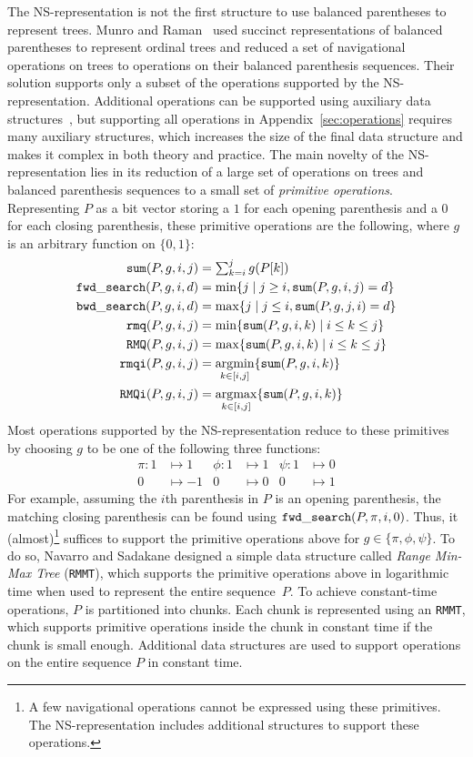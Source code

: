 The NS-representa\-tion is not the first structure to use balanced
parentheses to represent trees.  Munro and Raman~\cite{mr1997} used
succinct representations of balanced parentheses to represent ordinal trees
and reduced a set of navigational operations on trees to operations on their
balanced parenthesis sequences.  Their solution supports only a subset of the
operations supported by the NS-representation.  Additional operations
can be supported using auxiliary data structures~\cite{ly2008}, but
supporting all operations in Appendix~\ref{sec:operations} requires many
auxiliary structures, which increases the size of the final data structure
and makes it complex in both theory and practice.  The main novelty of
the NS-representation lies in its reduction of a large set of
operations on trees and balanced parenthesis sequences to a small set
of \emph{primitive operations}.  Representing $P$ as a bit vector
storing a $1$ for each opening parenthesis and a $0$ for each closing
parenthesis, these primitive operations are the following, where $g$ is an
arbitrary function on $\{0,1\}$:
\begin{align*}
  \mathtt{sum}(P,g,i,j) &= \textstyle\sum_{k=i}^jg(P[k])\\
  \mathtt{fwd\_search}(P,g,i,d) &= \min\{j \mid j \ge i, \mathtt{sum}(P,g,i,j) = d\}\\
  \mathtt{bwd\_search}(P,g,i,d) &= \max\{j \mid j \le i, \mathtt{sum}(P,g,j,i) = d\}\\
  \mathtt{rmq}(P,g,i,j) &= \min\{\mathtt{sum}(P,g,i,k) \mid i\le k\le j\}\\
  \mathtt{RMQ}(P,g,i,j) &= \max\{\mathtt{sum}(P,g,i,k) \mid i\le k\le j\}\\
  \mathtt{rmqi}(P,g,i,j) &= \operatorname*{arg\!\min}_{k\in[i,j]}\{\mathtt{sum}(P,g,i,k)\}\\
  \mathtt{RMQi}(P,g,i,j) &= \operatorname*{arg\!\max}_{k\in[i,j]}\{\mathtt{sum}(P,g,i,k)\}
\end{align*}
Most operations supported by the NS-representation reduce to these primitives
by choosing $g$ to be one of the following three functions:
\begin{align*}
  \pi : 1 &\mapsto 1 &\phi : 1 &\mapsto 1 & \psi : 1 &\mapsto 0\\
  0 &\mapsto -1 & 0 &\mapsto 0 & 0 &\mapsto 1
\end{align*}
For example, assuming the $i$th parenthesis in $P$ is an opening parenthesis,
the matching closing parenthesis can be found using
$\mathtt{fwd\_search}(P,\pi,i,0)$.  Thus, it (almost)\footnote{A few
  navigational operations cannot be expressed using these primitives.
  The NS-representation includes additional structures to support
  these operations.} suffices to support the primitive operations above for
$g \in \{\pi, \phi, \psi\}$.  To do so, Navarro and Sadakane designed
a simple data structure called \emph{Range Min-Max Tree} ({\tt RMMT}),
which supports the primitive operations above in logarithmic time when used
to represent the entire sequence~$P$.  To achieve constant-time
operations, $P$ is partitioned into chunks.  Each chunk is represented
using an {\tt RMMT}, which supports primitive operations inside the
chunk in constant time if the chunk is small enough.  Additional data
structures are used to support operations on the entire sequence $P$
in constant time.

